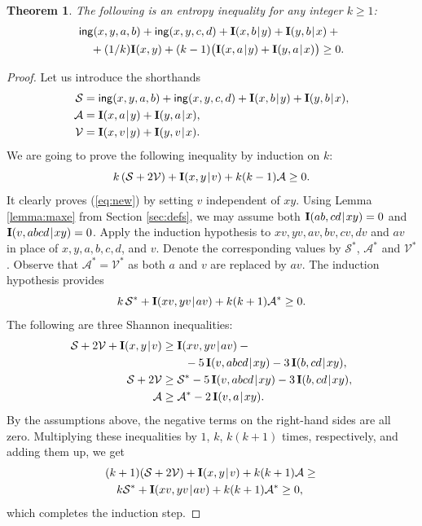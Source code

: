 \documentclass[10pt,a4paper]{amsart}
\def\|{\mskip1.5mu{|}\mskip1.5mu}
\def\I{\mathbf I}
\def\ing[#1,#2,#3,#4]{\mathsf{ing}(#1,#2,#3,#4\mkern 0mu)}
\newtheorem{theorem}{Theorem}
\begin{document}
\begin{theorem}\label{thm:neweq}
The following is an entropy inequality for any integer $k\ge 1$:
\begin{align}\label{eq:new}
  &\ing[x,y,a,b]+\ing[x,y,c,d]+\I(x,b\|y)+\I(y,b\|x) +{} \\
  & ~~~ + (1/k)\I(x,y)+(k-1)\big(\I(x,a\|y)+\I(y,a\|x)\big) \ge 0.
  \nonumber
\end{align}
\end{theorem}
\begin{proof}
Let us introduce the shorthands
\begin{align*}
  \mathcal S &= \ing[x,y,a,b]+\ing[x,y,c,d]+\I(x,b\|y)+\I(y,b\|x), \\
  \mathcal A &= \I(x,a\|y)+\I(y,a\|x), \\
  \mathcal V &= \I(x,v\|y)+\I(y,v\|x).
\end{align*}
We are going to prove the following inequality by induction on $k$:
$$
  k\,(\mathcal S + 2\mathcal V) + \I(x,y\|v)+ k(k-1)\mathcal A  \ge 0.
$$
It clearly proves (\ref{eq:new}) by setting $v$ independent of $xy$.
Using Lemma \ref{lemma:maxe} from Section \ref{sec:defs},
we may assume both $\I(ab,cd\|xy)=0$ and $\I(v,abcd\|xy)=0$. Apply the induction
hypothesis to $xv,yv,av,bv,cv,dv$  and $av$ in place of $x,y,\allowbreak
a,b,\allowbreak c,d$, and $v$.
Denote the corresponding values by $\mathcal S^*$, $\mathcal A^*$ and $\mathcal V^*$.
Observe that $\mathcal A^*=\mathcal V^*$ as both $a$ and $v$ are replaced by
$av$. The induction hypothesis provides
$$
    k\,\mathcal S^*+\I(xv,yv\|av) + k(k+1)\mathcal A^* \ge 0.
$$
The following are three Shannon inequalities:
\begin{align*}
   \mathcal S+2\mathcal V+\I(x,y\|v) & \ge \I(xv,yv\|av) -{} \\
       & ~~~~~~-5\,\I(v,abcd\|xy)-3\,\I(b,cd\|xy), \\
   \mathcal S+2\mathcal V  & \ge \mathcal S^*
      -5\,\I(v,abcd\|xy)-3\,\I(b,cd\|xy),  \\
   \mathcal A &\ge \mathcal A^* - 2\,\I(v,a\|xy).
\end{align*}
By the assumptions above, the negative terms on the right-hand sides are all zero.
Multiplying these inequalities by $1$, $k$, $k(k+1)$ times, respectively, and
adding them up, we get
\begin{align*}
  & (k+1)(\mathcal S+2\mathcal V)+\I(x,y\|v)+k(k+1)\mathcal A \ge {} \\
  & ~~~ k\mathcal S^*+\I(xv,yv\|av)+k(k+1)\mathcal A^* \ge 0,
\end{align*}
which completes the induction step.
\end{proof}
\end{document}
